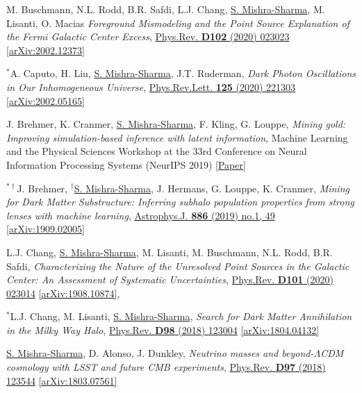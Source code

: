 \documentclass[letterpaper,11pt]{article}
\newenvironment{packed_enumerate}[1][]{
\begin{etaremune}[#1]
  \setlength{\itemsep}{4.0pt}
  \setlength{\parskip}{0pt}
  \setlength{\parsep}{0pt}}{\end{etaremune}
}
\begin{document}
\begin{packed_enumerate}[start=63]
  \item M. Buschmann, N.L. Rodd, B.R. Safdi, L.J. Chang, \underline{S. Mishra-Sharma}, M. Lisanti, O. Macias \emph{Foreground Mismodeling and the Point Source Explanation of the Fermi Galactic Center Excess},  \href{https://journals.aps.org/prd/abstract/10.1103/PhysRevD.102.023023}{Phys.Rev. \textbf{D102} (2020) 023023} \href{https://arxiv.org/abs/2002.12373}{[arXiv:2002.12373]} 
  \item $^*$A. Caputo, H. Liu, \underline{S. Mishra-Sharma}, J.T. Ruderman, \emph{Dark Photon Oscillations in Our Inhomogeneous Universe}, \href{https://journals.aps.org/prl/abstract/10.1103/PhysRevLett.125.221303}{Phys.Rev.Lett. \textbf{125} (2020) 221303} \href{https://arxiv.org/abs/2002.05165}{[arXiv:2002.05165]}
  \item J. Brehmer, K. Cranmer, \underline{S. Mishra-Sharma}, F. Kling, G. Louppe, \emph{Mining gold: Improving simulation-based inference with latent information}, {Machine Learning and the Physical Sciences Workshop at the 33rd Conference on Neural Information Processing Systems (NeurIPS 2019)} \href{https://ml4physicalsciences.github.io/files/NeurIPS_ML4PS_2019_16.pdf}{[Paper]}
  \item $^{*\dagger}$J. Brehmer, $^\dagger$\underline{S. Mishra-Sharma}, J. Hermans, G. Louppe, K. Cranmer, \emph{Mining for Dark Matter Substructure: Inferring subhalo population properties from strong lenses with machine learning}, \href{https://iopscience.iop.org/article/10.3847/1538-4357/ab4c41}{Astrophys.J. \textbf{886} (2019) no.1, 49} \href{https://arxiv.org/abs/1909.02005}{[arXiv:1909.02005]}
  \item L.J. Chang, \underline{S. Mishra-Sharma}, M. Lisanti, M. Buschmann, N.L. Rodd, B.R. Safdi, \emph{Characterizing the Nature of the Unresolved Point Sources in the Galactic Center: An Assessment of Systematic Uncertainties},  \href{https://journals.aps.org/prd/abstract/10.1103/PhysRevD.101.023014}{Phys.Rev. \textbf{D101} (2020) 023014} \href{https://arxiv.org/abs/1908.10874}{[arXiv:1908.10874]}, 
  \item $^*$L.J. Chang, M. Lisanti, \underline{S. Mishra-Sharma}, \emph{Search for Dark Matter Annihilation in the Milky Way Halo}, \href{https://journals.aps.org/prd/abstract/10.1103/PhysRevD.98.123004}{Phys.Rev. \textbf{D98} (2018) 123004} \href{https://arxiv.org/abs/1804.04132}{[arXiv:1804.04132]}
  \item \underline{S. Mishra-Sharma}, D. Alonso, J. Dunkley, \emph{Neutrino masses and beyond-$\Lambda$CDM cosmology with LSST and future CMB experiments}, \href{https://journals.aps.org/prd/abstract/10.1103/PhysRevD.97.123544}{Phys.Rev. \textbf{D97} (2018) 123544} \href{https://arxiv.org/abs/1803.07561}{[arXiv:1803.07561]}

\end{packed_enumerate}
\end{document}

